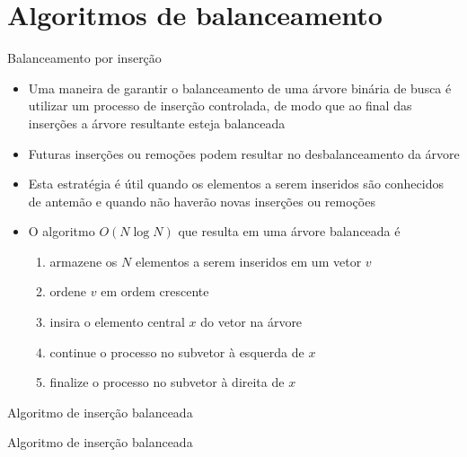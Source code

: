 \section{Algoritmos de balanceamento}

\begin{frame}[fragile]{Balanceamento por inserção}

    \begin{itemize}
        \item Uma maneira de garantir o balanceamento de uma árvore binária de busca
                é utilizar um processo de
            inserção controlada, de modo que ao final das inserções a árvore resultante esteja
            balanceada

        \item Futuras inserções ou remoções podem resultar no desbalanceamento da árvore

        \item Esta estratégia é útil quando os elementos a serem inseridos são conhecidos de
            antemão e quando não haverão novas inserções ou remoções

        \item O algoritmo $O(N\log N)$ que resulta em uma árvore balanceada é
        \begin{enumerate}
            \item armazene os $N$ elementos a serem inseridos em um vetor $v$
            \item ordene $v$ em ordem crescente
            \item insira o elemento central $x$ do vetor na árvore
            \item continue o processo no subvetor à esquerda de $x$
            \item finalize o processo no subvetor à direita de $x$
        \end{enumerate}
    \end{itemize}

\end{frame}

\begin{frame}[fragile]{Algoritmo de inserção balanceada}
\end{frame}

\begin{frame}[fragile]{Algoritmo de inserção balanceada}
\end{frame}

